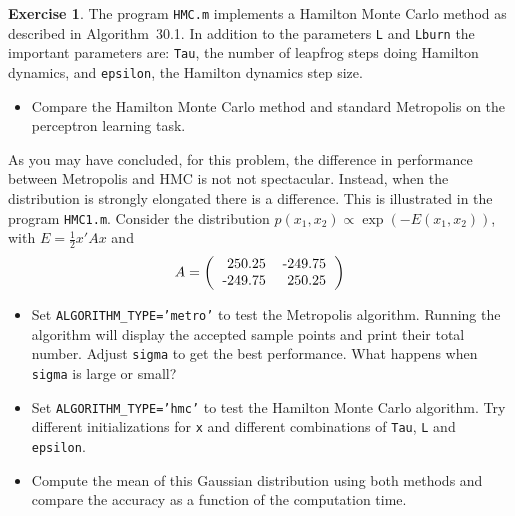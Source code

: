 \documentclass[a4paper]{article}
\theoremstyle{definition}
\newtheorem{ex}{Exercise}
\begin{document}
\begin{ex}

The program \texttt{HMC.m} implements a Hamilton Monte Carlo method as described in Algorithm~30.1. In addition to the parameters \texttt{L} and \texttt{Lburn} the important parameters are: \texttt{Tau}, the number of leapfrog steps doing Hamilton dynamics, and \texttt{epsilon}, the Hamilton dynamics step size.
\begin{itemize}
\item Compare the Hamilton Monte Carlo method and standard Metropolis on the perceptron learning task.
\end{itemize}
As you may have concluded, for this problem, the difference in performance  between Metropolis and HMC is not not spectacular. Instead, when the distribution is strongly elongated there is a difference. This is illustrated in the program \texttt{HMC1.m}. Consider the distribution $p(x_1,x_2)\propto \exp(-E(x_1,x_2))$, with $E=\frac{1}{2}x'Ax$ and
\[
A=\left(\begin{tabular}{rr}250.25 & -249.75\\-249.75&
250.25\end{tabular}\right)
\]
\begin{itemize}
\item Set \texttt{ALGORITHM\_TYPE='metro'} to test the Metropolis algorithm. Running the algorithm will display the accepted sample points and print their total number. Adjust \texttt{sigma} to get the best performance. What happens when \texttt{sigma} is large or small? 
\item Set \texttt{ALGORITHM\_TYPE='hmc'} to test the Hamilton Monte Carlo algorithm.  Try different initializations for \texttt{x} and different combinations of \texttt{Tau}, \texttt{L} and \texttt{epsilon}. 
\item Compute the mean of this Gaussian distribution using both methods and compare the accuracy as a function of the computation time.
\end{itemize}
\end{ex}
\end{document}

